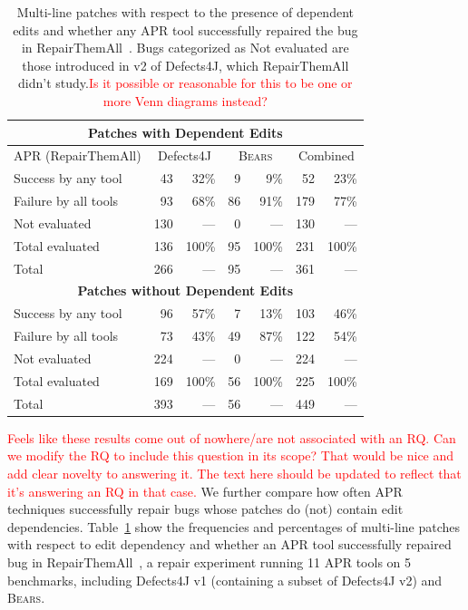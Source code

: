 \documentclass[10pt, conference]{IEEEtran}
\newcommand\todo[1]{\textcolor{red}{#1}}
\newcommand\bears{\textsc{Bears}\xspace}
\begin{document}
\begin{table}
{\begin{center}
	\begin{tabular}{l  rr  rr  rr}
		\toprule
		\multicolumn{7}{c}{\textbf{Patches with Dependent Edits}} \\
		\midrule
		APR (RepairThemAll) & \multicolumn{2}{c}{Defects4J} & \multicolumn{2}{c}{\bears} & \multicolumn{2}{c}{Combined} \\
		\midrule
		Success by any tool & 43 & 32\% & 9 & 9\% & 52 & 23\% \\
		Failure by all tools & 93 & 68\% & 86 & 91\% & 179 & 77\% \\
		Not evaluated & 130 & --- & 0 & --- & 130 & --- \\
		\midrule
		Total evaluated & 136 & 100\% & 95 & 100\% & 231 & 100\% \\
		Total & 266 & --- & 95 & --- & 361 & --- \\
		\midrule
		\multicolumn{7}{c}{\textbf{Patches without Dependent Edits}} \\
		\midrule
		Success by any tool & 96 & 57\% & 7 & 13\% & 103 & 46\% \\
		Failure by all tools & 73 & 43\% & 49 & 87\% & 122 & 54\% \\
		Not evaluated & 224 & --- & 0 & --- & 224 & --- \\
		\midrule
		Total evaluated & 169 & 100\% & 56 & 100\% & 225 & 100\% \\
		Total & 393 & --- & 56 & --- & 449 & --- \\
		\bottomrule
	\end{tabular}
 \end{center}
}
	\caption{Multi-line patches with respect to the presence of 
	dependent edits and whether any APR tool successfully 
	repaired the bug in RepairThemAll~\cite{durieux-repair-them-all}.
	Bugs categorized as {\normalfont Not evaluated} are those introduced in 
	v2 of Defects4J, which RepairThemAll didn't study.\todo{Is it possible
          or reasonable for this to be one or more Venn diagrams instead?}}
	\label{tab:dependency-repair-contingency-table}
\end{table}

\todo{Feels like these results come out of nowhere/are not associated with an
  RQ.  Can we modify the RQ to include this question in its scope? That would be
  nice and add clear novelty to answering it.  The text here should be updated
  to reflect that it's answering an RQ in that case.}
We further compare how often APR techniques 
successfully repair bugs whose patches do (not) contain edit dependencies.
Table~\ref{tab:dependency-repair-contingency-table}
show the frequencies and percentages of multi-line patches with respect to edit dependency 
and whether an APR tool successfully repaired bug in 
RepairThemAll~\cite{durieux-repair-them-all}, a repair experiment running 
11 APR tools on 5 benchmarks, including Defects4J v1 (containing a subset of Defects4J v2) and \bears.
\end{document}
